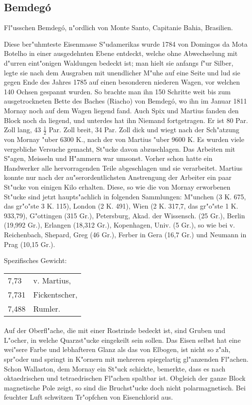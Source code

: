 \documentclass[a4paper, 11pt, oneside]{article}
\begin{document}
\subsection{Bemdegó}

Fl"usschen Bemdegó, n"ordlich von Monte Santo, Capitanie Bahia, Brasilien.

Diese ber"uhmteste Eisenmasse S"udamerikas wurde 1784 von Domingos da Mota Botelho in einer ausgedehnten Ebene entdeckt, welche ohne Abwechselung mit d"urren eint"onigen Waldungen bedeckt ist; man hielt sie anfangs f"ur Silber, legte sie nach dem Ausgraben mit unendlicher M"uhe auf eine Seite und lud sie gegen Ende des Jahres 1785 auf einen besonderen niederen Wagen, vor welchen 140 Ochsen gespannt wurden. So brachte man ihn 150 Schritte weit bis zum ausgetrockneten Bette des Baches (Riacho) von Bemdegó, wo ihn im Januar 1811 Mornay noch auf dem Wagen liegend fand. Auch Spix und Martius fanden den Block noch da liegend, und unterdes hat ihn Niemand fortgetragen. Er ist 80 Par. Zoll lang, 43 $\frac{1}{2}$ Par. Zoll breit, 34 Par. Zoll dick und wiegt nach der Sch"atzung von Mornay "uber 6300 K., nach der von Martius "uber 9600 K. Es wurden viele vergebliche Versuche gemacht, St"ucke davon abzuschlagen. Das Arbeiten mit S"agen, Meisseln und H"ammern war umsonst. Vorher schon hatte ein Handwerker alle hervorragenden Teile abgeschlagen und sie verarbeitet. Martius konnte nur nach der au"serordentlichsten Anstrengung der Arbeiter ein paar St"ucke von einigen Kilo erhalten. Diese, so wie die von Mornay erworbenen St"ucke sind jetzt haupts"achlich in folgenden Sammlungen: M"unchen (3 K. 675, das gr"o"ste 3 K. 115), London (2 K. 491), Wien (2 K. 317,7, das gr"o"ste 1 K. 933,79), G"ottingen (315 Gr.), Petersburg, Akad. der Wissensch. (25 Gr.), Berlin (19,992 Gr.), Erlangen (18,312 Gr.), Kopenhagen, Univ. (5 Gr.), so wie bei v. Reichenbach, Shepard, Greg (46 Gr.), Ferber in Gera (16,7 Gr.) und Neumann in Prag (10,15 Gr.).

Spezifisches Gewicht:  
\begin{table}[!ht]
    \centering
    \begin{tabular}{l l}
        7,73 & v. Martius,\\
        7,731 & Fickentscher,\\
        7,488 & Rumler.
    \end{tabular}
\end{table}
\paragraph{}
Auf der Oberfl"ache, die mit einer Rostrinde bedeckt ist, sind Gruben und L"ocher, in welche Quarzst"ucke eingekeilt sein sollen. Das Eisen selbst hat eine wei"sere Farbe und lebhafteren Glanz als das von Elbogen, ist nicht so z"ah, spr"oder und springt in K"ornern mit mehreren spiegelartig gl"anzenden Fl"achen. Schon Wallaston, dem Mornay ein St"uck schickte, bemerkte, dass es nach oktaedrischen und tetraedrischen Fl"achen spaltbar ist. Obgleich der ganze Block magnetische Pole zeigt, so sind die Bruchst"ucke doch nicht polarmagnetisch. Bei feuchter Luft schwitzen Tr"opfchen von Eisenchlorid aus.
\end{document}
